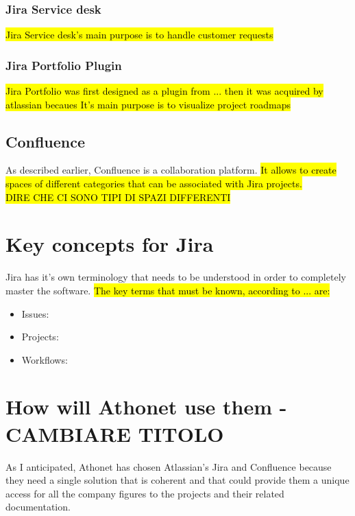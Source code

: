 		\subsubsection{Jira Service desk}
			\hl{Jira Service desk's main purpose is to handle customer requests}

		\subsubsection{Jira Portfolio Plugin}
			\hl{Jira Portfolio was first designed as a plugin from ... then it was acquired by atlassian becaues
			It's main purpose is to visualize project roadmaps}
		
	\subsection{Confluence}
		As described earlier, Confluence is a collaboration platform.
		\hl{It allows to create spaces of different categories that can be associated with Jira projects.\\DIRE CHE CI SONO TIPI DI SPAZI DIFFERENTI}
		
		
\section{Key concepts for Jira}
	Jira has it's own terminology that needs to be understood in order to completely master the software.	
	\hl{The key terms that must be known, according to ... are:}
	\begin{itemize}
		\item Issues: 
		\item Projects: 
		\item Workflows: 
	\end{itemize}
	
\section{How will Athonet use them - CAMBIARE TITOLO}

	As I anticipated, Athonet has chosen Atlassian's Jira and Confluence because they need a single solution that is coherent and that could provide them a unique access for all the company figures to the projects and their related documentation.
	
